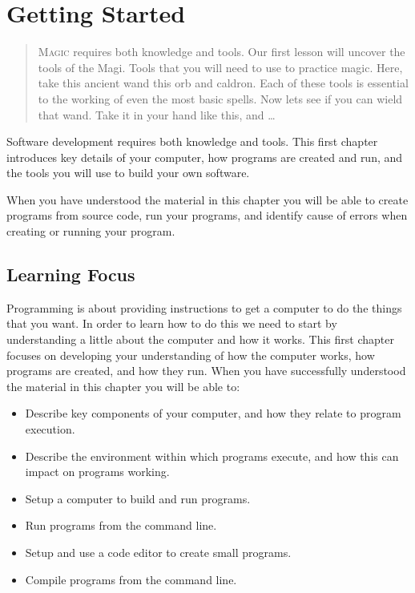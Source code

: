 \setcounter{chapter}{-1}
\chapter{Getting Started} %
\label{cha:getting-started}

\begin{quote}
  \Fontlukas\Large
  \renewcommand{\LettrineTextFont}{\relax}
  \lettrine[image=true,lines=3,lraise=0.1]
  {M}{agic} requires both knowledge and tools. Our first lesson will uncover the tools of the Magi. Tools that you will need to use to practice magic. Here, take this ancient wand this orb and caldron. Each of these tools is essential to the working of even the most basic spells. Now lets see if you can wield that wand. Take it in your hand like this, and \ldots
\end{quote}

\bigskip

Software development requires both knowledge and tools. This first chapter introduces key details of your computer, how programs are created and run, and the tools you will use to build your own software.

When you have understood the material in this chapter you will be able to create programs from source code, run your programs, and identify cause of errors when creating or running your program.

\minitoc

\clearpage
\section{Learning Focus}
Programming is about providing instructions to get a computer to do the things that you want. In order to learn how to do this we need to start by understanding a little about the computer and how it works. This first chapter focuses on developing your understanding of how the computer works, how programs are created, and how they run. When you have successfully understood the material in this chapter you will be able to:

\begin{itemize}
  \item Describe key components of your computer, and how they relate to program execution.
  \item Describe the environment within which programs execute, and how this can impact on programs working.
  \item Setup a computer to build and run programs.
  \item Run programs from the command line.
  \item Setup and use a code editor to create small programs.
  \item Compile programs from the command line.
\end{itemize}

